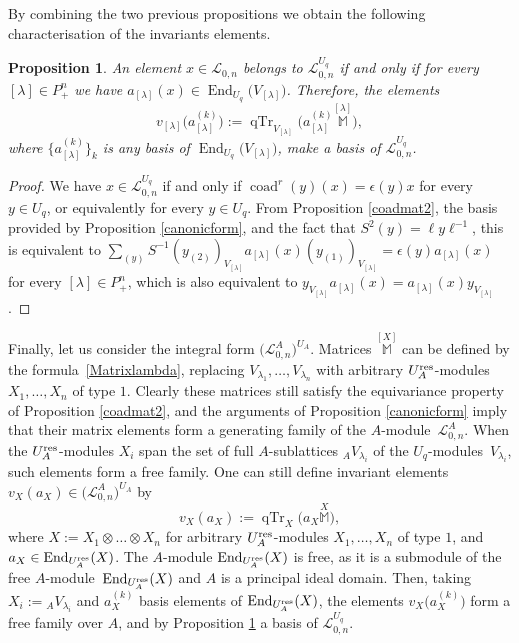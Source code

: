 \documentclass[pdftex]{sigma}%
\numberwithin{equation}{section}
\numberwithin{figure}{section}
\newtheorem{prop}[teo]{Proposition}
\newcommand{\Ll}{{\mathcal L}}
\begin{document}
By combining the two previous propositions we obtain the following characterisation of the invariants elements.

\begin{prop} \label{linbaseinv} An element $x\in \Ll_{0,n}$ belongs to $\Ll_{0,n}^{U_q}$ if and only if for every $[\lambda] \in P_+^n$ we have $a_{[\lambda]}(x)\in \operatorname{End}_{U_q}\big(V_{[\lambda]}\big)$. Therefore, the elements
\begin{equation}\label{defvectinv}
v_{[\lambda]}\big(a_{[\lambda]}^{(k)}\big) := \operatorname{qTr}_{V_{[\lambda]}} \big( a_{[\lambda]} ^{(k)}\stackrel{[\lambda]}{\mathbb M}\!\big),
\end{equation}
where $\big\{a_{[\lambda]}^{(k)}\big\}_{k}$ is any basis of $\operatorname{End}_{U_q}\big(V_{[\lambda]}\big)$, make a basis of $\Ll_{0,n}^{U_q}$.
\end{prop}
\begin{proof}
We have $x\in \Ll_{0,n}^{U_q}$ if and only if $\operatorname{coad}^r(y)(x)=\epsilon(y)x$ for every $y\in U_q$, or equivalently for every $y\in U_q$. From Proposition \ref{coadmat2}, the basis provided by Proposition \ref{canonicform}, and the fact that $S^2(y) = \ell y\ell^{-1}$, this is equivalent to $\textstyle \sum_{(y)}S^{-1}(y_{(2)})_{V_{[\lambda]}}a_{[\lambda]}(x)(y_{(1)})_{V_{[\lambda]}}=\epsilon(y) a_{[\lambda]}(x)$ for every $[\lambda] \in P_+^n$, which is also equivalent to $y_{V_{[\lambda]}}a_{[\lambda]}(x)=a_{[\lambda]}(x)y_{V_{[\lambda]}}$.\end{proof}

Finally, let us consider the integral form $\big(\Ll_{0,n}^A\big)^{U_A}$. Matrices $\stackrel{[X]}{\mathbb M}$ can be defined by the formula~\eqref{Matrixlambda}, replacing $V_{\lambda_1}, \dots, V_{\lambda_n}$ with arbitrary $U_A^{\rm res}$-modules $X_1,\dots,X_n$ of type $1$. Clearly these matrices still satisfy the equivariance property of Proposition \ref{coadmat2}, and the arguments of Proposition \ref{canonicform} imply that their matrix elements form a generating family of the $A$-mo\-du\-le~$\Ll_{0,n}^A$. When the $U_A^{\rm res}$-modules $X_i$ span the set of full $A$-sublattices ${}_AV_{\lambda_i}$ of the $U_q$-modules~$V_{\lambda_i}$, such elements form a free family. One can still define invariant elements $v_{X}(a_{X})\in \big(\Ll_{0,n}^A\big)^{U_A}$ by
\[
v_{X}(a_{X}) := \operatorname{qTr}_{X} \big( a_{X}\stackrel{X}{\mathbb M}\!\big),
\]
where $X:=X_1\otimes \dots \otimes X_n$ for arbitrary $U_A^{\rm res}$-modules $X_1,\dots,X_n$ of type $1$, and $a_{X} \in \operatorname{End}_{U_A^{\rm res}}(X)$. The $A$-module $\operatorname{End}_{U_A^{\rm res}}(X)$ is free, as it is a submodule of the free $A$-mo\-du\-le~$\operatorname{End}_{U_A^{\rm res}}(X)$ and $A$ is a principal ideal domain. Then, taking $X_i := {}_AV_{\lambda_i}$ and $a_{X}^{(k)}$ basis elements of $\operatorname{End}_{U_A^{\rm res}}(X)$, the elements $v_{X}\big(a_{X}^{(k)}\big)$ form a free family over $A$, and by Proposition \ref{linbaseinv} a basis of $\Ll_{0,n}^{U_q}$.
\end{document}
